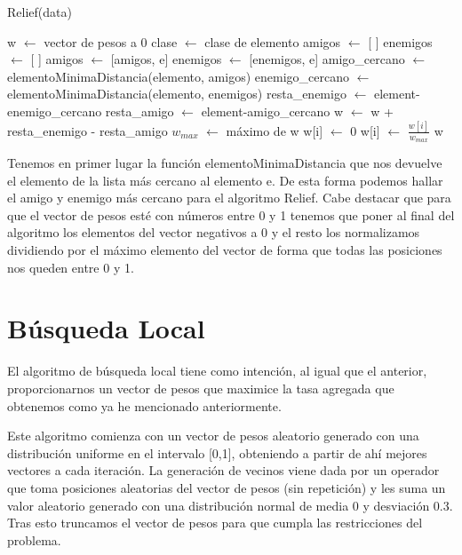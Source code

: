 \documentclass[12pt,a4paper]{article}
\begin{document}
	\begin{algorithm}
		\caption{Relief(data)}
		\begin{algorithmic}
			\STATE w $\leftarrow$ vector de pesos a 0
			\STATE clase $\leftarrow$ clase de elemento
			\STATE amigos $\leftarrow$ [ ]
			\STATE enemigos $\leftarrow$ [ ]
			\STATE amigos $\leftarrow$ [amigos, e]
			\ELSE
			\STATE enemigos $\leftarrow$ [enemigos, e]
			\ENDIF
			\ENDFOR
			\STATE amigo\_cercano $\leftarrow$ elementoMinimaDistancia(elemento, amigos)
			\STATE enemigo\_cercano $\leftarrow$ elementoMinimaDistancia(elemento, enemigos)
			\STATE resta\_enemigo $\leftarrow$ element-enemigo\_cercano
			\STATE resta\_amigo $\leftarrow$ element-amigo\_cercano
			\STATE w $\leftarrow$ w + resta\_enemigo - resta\_amigo
			\STATE $w_{max}$ $\leftarrow$ máximo de w
			\ENDFOR
			\STATE w[i] $\leftarrow$ 0
			\ELSE
			\STATE w[i] $\leftarrow$ $\frac{w[i]}{w_{max}}$
			\ENDIF
			\ENDFOR
			\RETURN w
		\end{algorithmic}
	\end{algorithm}
	
	Tenemos en primer lugar la función elementoMinimaDistancia que nos devuelve el elemento de la lista más cercano al elemento e. De esta forma podemos hallar el amigo y enemigo más cercano para el algoritmo Relief. Cabe destacar que para que el vector de pesos esté con números entre 0 y 1 tenemos que poner al final del algoritmo los elementos del vector negativos a 0 y el resto los normalizamos dividiendo por el máximo elemento del vector de forma que todas las posiciones nos queden entre 0 y 1.
	
	\newpage
	
	\section{Búsqueda Local}
	\label{sec:bl}
	
	El algoritmo de búsqueda local tiene como intención, al igual que el anterior, proporcionarnos un vector de pesos que maximice la tasa agregada que obtenemos como ya he mencionado anteriormente.
	
	Este algoritmo comienza con un vector de pesos aleatorio generado con una distribución uniforme en el intervalo [0,1], obteniendo a partir de ahí mejores vectores a cada iteración. La generación de vecinos viene dada por un operador que toma posiciones aleatorias del vector de pesos (sin repetición) y les suma un valor aleatorio generado con una distribución normal de media 0 y desviación 0.3. Tras esto truncamos el vector de pesos para que cumpla las restricciones del problema.
	
\end{document}
